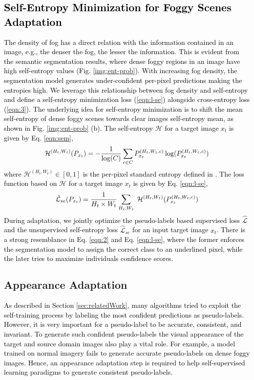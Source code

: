\documentclass[final,5p,times,twocolumn]{elsarticle}
\begin{document}
\textcolor{black}{
\subsection{Self-Entropy Minimization for Foggy Scenes Adaptation}
\label{sec:sem}
The density of fog has a direct relation with the information contained in an image, e.g., the denser the fog, the lesser the information. 
\textcolor{black}{This is evident from the semantic segmentation results, where dense foggy regions in an image have high self-entropy values (Fig. \ref{img:ent-prob}).}
With increasing fog density, the segmentation model generates under-confident per-pixel predictions making the entropies high. We leverage this relationship between fog density and self-entropy and define a self-entropy minimization loss (\ref{eqn:l-se}) alongside cross-entropy loss (\ref{eqn:3}). 
The underlying idea for self-entropy minimization is to shift the mean self-entropy of dense foggy scenes towards clear images self-entropy mean, as shown in Fig. \ref{img:ent-prob} (b).  
The self-entropy $\mathcal{H}$ for a target image $x_t$ is given by Eq. \ref{eqn:sem},
\begin{equation}
\small
    \mathcal{H}^{(H_t,W_t)} (P_{x_t}) = - \frac{1}{\log (C)} \sum_{c\in C} P_{x_t}^{(H_t,W_t,c)} \log (P_{x_t}^{(H_t,W_t,c)})
\label{eqn:sem}
\end{equation}
where $\mathcal{H}^{(H_t,W_t)} \in [0, 1]$ is the per-pixel standard entropy defined in \cite{shannon1948mathematical}.  
The loss function based on $\mathcal{H}$ for a target image $x_t$ is given by Eq. \ref{eqn:l-se},
\begin{equation}
\small
    \hat{\mathcal{L}}_{se} (P_{x_t}) = \frac{1}{H_t \times W_t} \sum_{H_t,W_t} ~ \mathcal{H}^{(H_t,W_t)} (P_{x_t}^{(H_t,W_t,c)})
\label{eqn:l-se}
\end{equation}
During adaptation, we jointly optimize the pseudo-labels based supervised loss $\hat{\mathcal{L}}$ and the unsupervised self-entropy loss $\hat{\mathcal{L}}_{se}$ for an input target image $x_t$. There is a strong resemblance in Eq. \ref{eqn:2} and Eq. \ref{eqn:l-se}, where the former enforces the segmentation model to assign the correct class to an underlined pixel, while the later tries to maximize individuals confidence scores. }

\subsection{Appearance Adaptation}
\textcolor{black}{
As described in Section \ref{sec:relatedWork}, many algorithms tried to exploit the self-training process by labeling the most confident predictions as pseudo-labels. However, it is very important for a pseudo-label to be accurate, consistent, and invariant. 
To generate such confident pseudo-labels the visual appearance of the target and source domain images also play a vital role. For example, a model trained on normal imagery fails to generate accurate pseudo-labels on dense foggy images. 
Hence, an appearance adaptation step is required to help self-supervised learning paradigms to generate consistent pseudo-labels.} 
\end{document}
